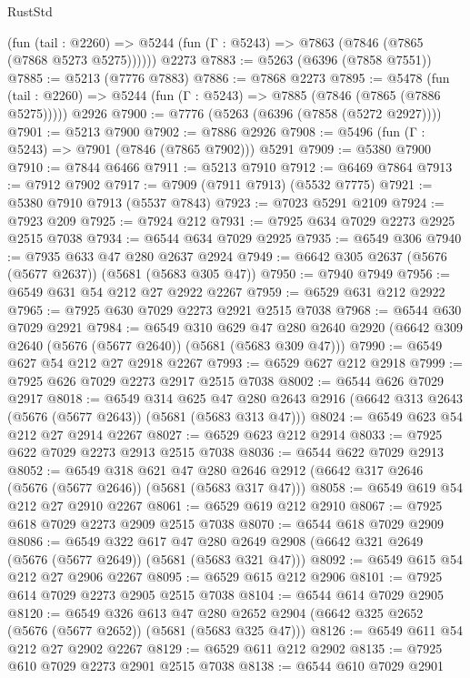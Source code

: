 \begin{lexlean}{RustStd}
\begin{coremodule}
      (fun (tail : @2260) => @5244 (fun (Γ : @5243) => @7863 (@7846 (@7865 (@7868 @5273 @5275))))))
    @2273
@7883 := @5263 (@6396 (@7858 @7551))
@7885 := @5213 (@7776 @7883)
@7886 := @7868 @2273
@7895 := @5478
    (fun (tail : @2260) => @5244 (fun (Γ : @5243) => @7885 (@7846 (@7865 (@7886 @5275)))))
    @2926
@7900 := @7776 (@5263 (@6396 (@7858 (@5272 @2927))))
@7901 := @5213 @7900
@7902 := @7886 @2926
@7908 := @5496 (fun (Γ : @5243) => @7901 (@7846 (@7865 @7902))) @5291
@7909 := @5380 @7900
@7910 := @7844 @6466
@7911 := @5213 @7910
@7912 := @6469 @7864
@7913 := @7912 @7902
@7917 := @7909 (@7911 @7913) (@5532 @7775)
@7921 := @5380 @7910 @7913 (@5537 @7843)
@7923 := @7023 @5291 @2109
@7924 := @7923 @209
@7925 := @7924 @212
@7931 := @7925 @634 @7029 @2273 @2925 @2515 @7038
@7934 := @6544 @634 @7029 @2925
@7935 := @6549 @306
@7940 := @7935 @633 @47 @280 @2637 @2924
@7949 := @6642 @305 @2637 (@5676 (@5677 @2637)) (@5681 (@5683 @305 @47))
@7950 := @7940 @7949
@7956 := @6549 @631 @54 @212 @27 @2922 @2267
@7959 := @6529 @631 @212 @2922
@7965 := @7925 @630 @7029 @2273 @2921 @2515 @7038
@7968 := @6544 @630 @7029 @2921
@7984 := @6549
    @310
    @629
    @47
    @280
    @2640
    @2920
    (@6642 @309 @2640 (@5676 (@5677 @2640)) (@5681 (@5683 @309 @47)))
@7990 := @6549 @627 @54 @212 @27 @2918 @2267
@7993 := @6529 @627 @212 @2918
@7999 := @7925 @626 @7029 @2273 @2917 @2515 @7038
@8002 := @6544 @626 @7029 @2917
@8018 := @6549
    @314
    @625
    @47
    @280
    @2643
    @2916
    (@6642 @313 @2643 (@5676 (@5677 @2643)) (@5681 (@5683 @313 @47)))
@8024 := @6549 @623 @54 @212 @27 @2914 @2267
@8027 := @6529 @623 @212 @2914
@8033 := @7925 @622 @7029 @2273 @2913 @2515 @7038
@8036 := @6544 @622 @7029 @2913
@8052 := @6549
    @318
    @621
    @47
    @280
    @2646
    @2912
    (@6642 @317 @2646 (@5676 (@5677 @2646)) (@5681 (@5683 @317 @47)))
@8058 := @6549 @619 @54 @212 @27 @2910 @2267
@8061 := @6529 @619 @212 @2910
@8067 := @7925 @618 @7029 @2273 @2909 @2515 @7038
@8070 := @6544 @618 @7029 @2909
@8086 := @6549
    @322
    @617
    @47
    @280
    @2649
    @2908
    (@6642 @321 @2649 (@5676 (@5677 @2649)) (@5681 (@5683 @321 @47)))
@8092 := @6549 @615 @54 @212 @27 @2906 @2267
@8095 := @6529 @615 @212 @2906
@8101 := @7925 @614 @7029 @2273 @2905 @2515 @7038
@8104 := @6544 @614 @7029 @2905
@8120 := @6549
    @326
    @613
    @47
    @280
    @2652
    @2904
    (@6642 @325 @2652 (@5676 (@5677 @2652)) (@5681 (@5683 @325 @47)))
@8126 := @6549 @611 @54 @212 @27 @2902 @2267
@8129 := @6529 @611 @212 @2902
@8135 := @7925 @610 @7029 @2273 @2901 @2515 @7038
@8138 := @6544 @610 @7029 @2901

\end{coremodule}
\end{lexlean}
